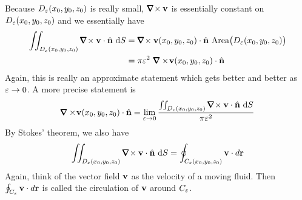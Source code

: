 Because  $D_\varepsilon(x_0,y_0,z_0)$ is really small, $\vnabla\!\times\vv$ is 
essentially constant on $D_\varepsilon(x_0,y_0,z_0)$ and we essentially have
\begin{align*}
\dblInt_{D_\veps(x_0,y_0,z_0)} \vnabla\!\times \vv\cdot\hn\ \dee{S}
&=\vnabla\!\times \vv(x_0,y_0,z_0)\cdot\hn\ \text{Area}\big(D_\veps(x_0,y_0,z_0)\big) \\
&=\pi\veps^2\ \vnabla\times\! \vv(x_0,y_0,z_0)\cdot\hn
\end{align*}
Again, this is really an approximate statement which gets better and 
better as $\varepsilon\rightarrow 0$. A more precise statement is 
\begin{align*}
\vnabla\times\! \vv(x_0,y_0,z_0)\cdot\hn
=\lim_{\veps\rightarrow 0} 
    \frac{\dblInt_{D_\veps(x_0,y_0,z_0)} \vnabla\!\times \vv\cdot\hn\ \dee{S}}
         {\pi\veps^2}
\end{align*}
By Stokes' theorem, we also have
\begin{align*}
\dblInt_{D_\veps(x_0,y_0,z_0)} \vnabla\!\times \vv\cdot\hn\ \dee{S}
=\oint_{C_\veps(x_0,y_0,z_0)} \vv\cdot d\vr
\end{align*}
Again, think of the vector field $\mathbf{v}$ as the velocity of a moving fluid.   
Then $\oint_{C_\varepsilon} \mathbf{v}\cdot d\mathbf{r}$ is called the circulation
of $\mathbf{v}$ around $C_\varepsilon$. 


